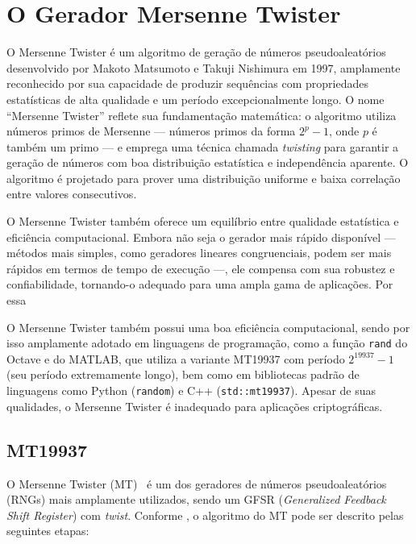 \section{O Gerador Mersenne Twister}

O Mersenne Twister é um algoritmo de geração de números pseudoaleatórios
desenvolvido por Makoto Matsumoto e Takuji Nishimura em 1997, amplamente
reconhecido por sua capacidade de produzir sequências com propriedades
estatísticas de alta qualidade e um período excepcionalmente longo. O nome
``Mersenne Twister'' reflete sua fundamentação matemática: o algoritmo utiliza
números primos de Mersenne --- números primos da forma $2^p - 1$, onde $p$ é
também um primo --- e emprega uma técnica chamada \textit{twisting} para
garantir a geração de números com boa distribuição estatística e independência
aparente. O algoritmo é projetado para prover uma distribuição uniforme e baixa
correlação entre valores consecutivos.

O Mersenne Twister também oferece um equilíbrio entre qualidade estatística e
eficiência computacional. Embora não seja o gerador mais rápido disponível ---
métodos mais simples, como geradores lineares congruenciais, podem ser mais
rápidos em termos de tempo de execução ---, ele compensa com sua robustez e
confiabilidade, tornando-o adequado para uma ampla gama de aplicações. Por essa

O Mersenne Twister também possui uma boa eficiência computacional, sendo por
isso amplamente adotado em linguagens de programação, como a função
\texttt{rand} do Octave e do MATLAB, que utiliza a variante MT19937 com período
$2^{19937} - 1$ (seu período extremamente longo), bem como em bibliotecas
padrão de linguagens como Python (\texttt{random}) e C++
(\texttt{std::mt19937}). Apesar de suas qualidades, o Mersenne Twister é
inadequado para aplicações criptográficas.


\subsection{MT19937}

O Mersenne Twister (MT)~\parencite{matsumoto1998mersenne} é um dos geradores de
números pseudoaleatórios (RNGs) mais amplamente utilizados, sendo um GFSR
(\textit{Generalized Feedback Shift Register}) com \textit{twist}.
Conforme \textcite{tan2016}, o algoritmo
do MT pode ser descrito pelas seguintes etapas:

